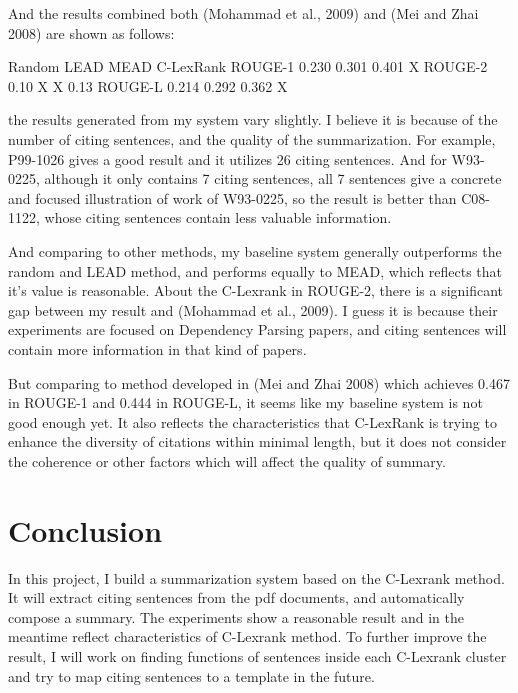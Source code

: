 \documentclass[hyp]{socreport}
\begin{document}
And the results combined both (Mohammad et al., 2009) and (Mei and
Zhai 2008) are shown as follows:

                    Random     LEAD     MEAD     C-LexRank
ROUGE-1            0.230      0.301      0.401        X
ROUGE-2            0.10          X       X           0.13
ROUGE-L            0.214      0.292      0.362        X


the results generated from my system vary slightly. I believe it is
because of the number of citing sentences, and the 
quality of the summarization. For example, P99-1026 gives a good
result and it utilizes 26 citing sentences. And for W93-0225, 
although it only contains 7 citing sentences, all 7 sentences give a
concrete and focused illustration of work of W93-0225, 
so the result is better than C08-1122, whose citing sentences contain
less valuable information. 

  And comparing to other methods, my baseline system generally
  outperforms the random and LEAD method, and performs equally 
to MEAD, which reflects that it's value is reasonable. About the
C-Lexrank in ROUGE-2, there is a significant gap between 
my result and (Mohammad et al., 2009). I guess it is because their
experiments are focused on Dependency Parsing papers, 
and citing sentences will contain more information in that kind of
papers.  

    But comparing to method developed in (Mei and Zhai 2008) which
    achieves 0.467 in ROUGE-1 and 0.444 in ROUGE-L, it seems 
like my baseline system is not good enough yet. It also reflects the
characteristics that C-LexRank is trying to enhance the 
diversity of citations within minimal length, but it does not consider
the coherence or other factors which will affect the 
quality of summary. 

\section{Conclusion}

In this project, I build a summarization system based on the C-Lexrank
method. It will extract citing sentences from the pdf 
documents, and automatically compose a summary. The experiments show a
reasonable result and in the meantime reflect characteristics
 of C-Lexrank method. To further improve the result, I will work on
 finding functions of sentences inside each C-Lexrank cluster and 
try to map citing sentences to a template in the future.



\end{document}
